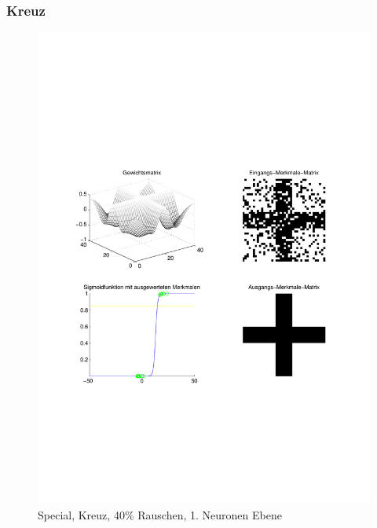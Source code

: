 \subsubsection{Kreuz}
\begin{figure}[hbt]
	\begin{minipage}{0.8 \textwidth}
		\includegraphics[width=\textwidth]{./Bilder/Auswertung/Endergebnis/TypeSpecial_Rauschen40_Cross_Layer1}
		\caption{Special, Kreuz, 40\% Rauschen, 1. Neuronen Ebene}
		\label{Special_Kreuz_40_1}
	\end{minipage}
	\vfill
	\begin{minipage}{0.8 \textwidth}

\end{minipage}
\end{figure}
